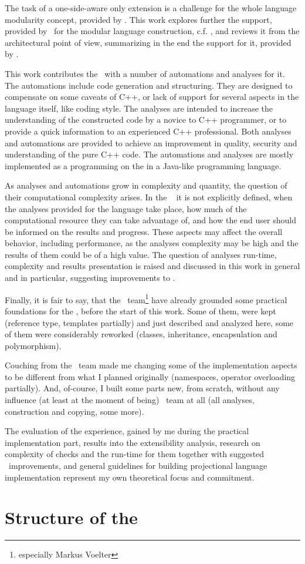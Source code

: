 The task of a one-side-aware only extension is a challenge for the whole language modularity concept, 
provided by \jbmps. This work explores further the support, provided by \jbmps\ for the modular 
language construction, c.f. \cite{2012_ratiu_modular_dsls_and_analyses}, and reviews it from the architectural point of view,
summarizing in the end the support for it, provided by \jbmps.

This work contributes the \cpppl\ with a number of automations and analyses for it. The automations include code 
generation and structuring. They are designed to compensate on some caveats of C++, or lack of support for 
several aspects in the language itself, like coding style. The analyses are intended to increase the understanding of the constructed
code by a novice to C++ programmer, or to provide a quick information to an experienced C++ professional. 
Both analyses and automations are provided to achieve an improvement in quality, security and understanding of 
the pure C++ code. The automations and analyses are mostly implemented as a programming on the  
in a Java-like programming language.

As analyses and automations grow in complexity and quantity, the question of their computational complexity arises.
In the \jbmps\  it is not explicitly defined, when the analyses provided for the language take place, 
how much of the computational resource they can take advantage of, and how the end user should be informed on the results and progress. 
These aspects may affect the overall  behavior, including performance, as the analyses complexity may be high and the results of them could 
be of a high value. 
The question of analyses run-time, complexity and results presentation is raised and discussed in 
this work in general and in particular, suggesting improvements to \jbmps {}.

Finally, it is fair to say, that the \mbdr\ team\footnote{especially Markus Voelter} have already grounded some practical foundations for the \pcpp, 
before the start of this work. Some of them, were kept (reference type, templates partially) and just described and analyzed 
here, some of them were considerably reworked (classes, inheritance, encapsulation and polymorphism). 

Couching from the \mbdr\ team made me changing some of the implementation aspects to be different from what I planned originally (namespaces,
operator overloading partially). And, of-course, I built some parts new, from scratch, without any influence (at least at the moment of being) \mbdr\ team 
at all (all analyses, construction and copying, some more). 

The evaluation of the experience, gained by me during the practical implementation part, results into the extensibility analysis, 
research on complexity of checks and the run-time for them together with suggested \jbmps\ improvements, and general guidelines 
for building projectional language implementation represent my own theoretical focus and commitment.

\section{Structure of the \MT}

